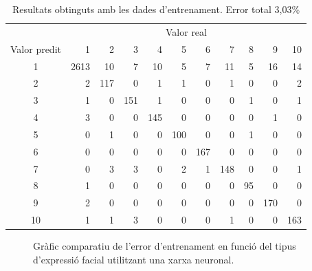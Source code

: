 \documentclass[a4paper]{article}
\begin{document}
\begin{table}[H]
	\centering
	\def\arraystretch{1.2}
	\begin{tabular}{|c|rrrrrrrrrr|}
		\hline
		& \multicolumn{10}{c|}{Valor real} \\
		Valor predit & 1 & 2 & 3 & 4 & 5 & 6 & 7 & 8 & 9 & 10 \\
		\hline
		1 & 2613 & 10 & 7 & 10 & 5 & 7 & 11 & 5 & 16 & 14 \\
		2 & 2 & 117 & 0 & 1 & 1 & 0 & 1 & 0 & 0 & 2 \\
		3 & 1 & 0 & 151 & 1 & 0 & 0 & 0 & 1 & 0 & 1 \\
		4 & 3 & 0 & 0 & 145 & 0 & 0 & 0 & 0 & 1 & 0 \\
		5 & 0 & 1 & 0 & 0 & 100 & 0 & 0 & 1 & 0 & 0 \\
		6 & 0 & 0 & 0 & 0 & 0 & 167 & 0 & 0 & 0 & 0 \\
		7 & 0 & 3 & 3 & 0 & 2 & 1 & 148 & 0 & 0 & 1 \\
		8 & 1 & 0 & 0 & 0 & 0 & 0 & 0 & 95 & 0 & 0 \\
		9 & 2 & 0 & 0 & 0 & 0 & 0 & 0 & 0 & 170 & 0 \\
		10 & 1 & 1 & 3 & 0 & 0 & 0 & 1 & 0 & 0 & 163 \\
		\hline
	\end{tabular}
	\caption{Resultats obtinguts amb les dades d'entrenament. Error total 3,03\%}
	\label{tab:nnet_k1}
\end{table}

\begin{figure}[H]
	\centering
	\captionsetup{width=0.8\textwidth}
	\caption{Gràfic comparatiu de l'error d'entrenament en funció del tipus d'expressió facial utilitzant una xarxa neuronal.}
\end{figure}
\end{document}
